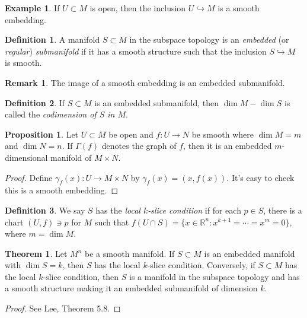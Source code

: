 \documentclass[10pt,letterpaper,cm]{nupset}
\theoremstyle{definition}
\newtheorem*{definition}{Definition}
\newtheorem{exmp}{Example}
\newtheorem{remark}{Remark}
\newtheorem{theorem}{Theorem}
\newtheorem{prop}{Proposition}
\newcommand{\R}{\mathbb R}
\newcommand{\1}{\mathbf{1}}
\newcommand{\0}{\vec 0}
\begin{document}
\begin{exmp}
If $U \subset M$ is open, then the inclusion $U \hookrightarrow M$ is a smooth embedding.
\end{exmp}

\begin{definition}
A manifold $ S\subset M$ in the subspace topology is an \textit{embedded} (or \textit{regular}) \textit{submanifold} if it has a smooth structure such that the inclusion $S \hookrightarrow M$ is smooth.
\end{definition}

\begin{remark}
The image of a smooth embedding is an embedded submanifold.
\end{remark}

\begin{definition}
If $S \subset M$ is an embedded submanifold, then $\dim M - \dim S$ is called the \textit{codimension of $S$ in $M$}.
\end{definition}

\begin{prop}
Let $U \subset M$ be open and $f: U \to N$ be smooth where $\dim M = m$ and $\dim N = n$. If $\Gamma(f)$ denotes the graph of $f$, then it is an embedded $m$-dimensional manifold of $M \times N$.
\end{prop}
\begin{proof}
Define $\gamma_f(x) : U \to M \times N$ by $\gamma_f(x) = (x, f(x))$. It's easy to check this is a smooth embedding.
\end{proof}

\begin{definition}
We say $S$ has the \textit{local $k$-slice condition} if for each $p\in S$, there is a chart $(U, f)\ni p$ for $M$ such that $f(U \cap S) = \{x\in \R^n : x^{k+1} = \cdots = x^m = 0\}$, where $m = \dim M$.
\end{definition}

\begin{theorem}
Let $M^n$ be a smooth manifold. If $S\subset M$ is an embedded manifold with $\dim S = k$, then $S$ has the local $k$-slice condition. Conversely, if $S\subset M$ has the local $k$-slice condition, then $S$ is a manifold in the subspace topology and has a smooth structure making it an embedded submanifold of dimension $k$.
\end{theorem}
\begin{proof}
See Lee, Theorem 5.8.
\end{proof}
\end{document}
